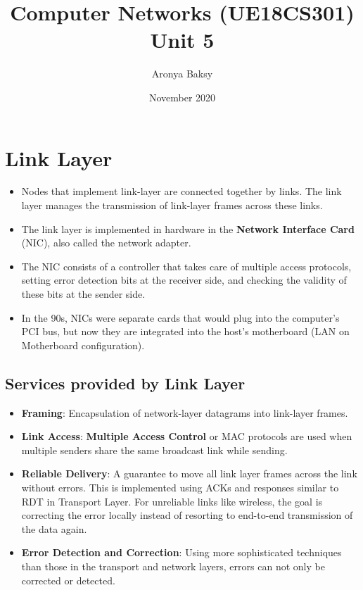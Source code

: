 \documentclass[a4paper]{article}
\title{Computer Networks (UE18CS301)\\
 \large Unit 5
 }
\author{Aronya Baksy}
\date{November 2020}
\theoremstyle{plain}
\theoremstyle{definition}
\begin{document}
\maketitle

\section{Link Layer}
\begin{itemize}
    \item Nodes that implement link-layer are connected together by links. The link layer manages the transmission of link-layer frames across these links. 
    
    \item The link layer is implemented in hardware in the \textbf{Network Interface Card} (NIC), also called the network adapter. 
    
    \item The NIC consists of a controller that takes care of multiple access protocols, setting error detection bits at the receiver side, and checking the validity of these bits at the sender side. 
    
    \item In the 90s, NICs were separate cards that would plug into the computer's PCI bus, but now they are integrated into the host's motherboard (LAN on Motherboard configuration). 
\end{itemize}

\subsection{Services provided by Link Layer}
\begin{itemize}
    \item \textbf{Framing}: Encapsulation of network-layer datagrams into link-layer frames. 
    
    \item \textbf{Link Access}: \textbf{Multiple Access Control} or MAC protocols are used when multiple senders share the same broadcast link while sending.
    
    \item \textbf{Reliable Delivery}: A guarantee to move all link layer frames across the link without errors. This is implemented using ACKs and responses similar to RDT in Transport Layer. For unreliable links like wireless, the goal is correcting the error locally instead of resorting to end-to-end transmission of the data again. 
    
    \item \textbf{Error Detection and Correction}: Using more sophisticated techniques than those in the transport and network layers, errors can not only be corrected or detected. 
\end{itemize}
\end{document}
